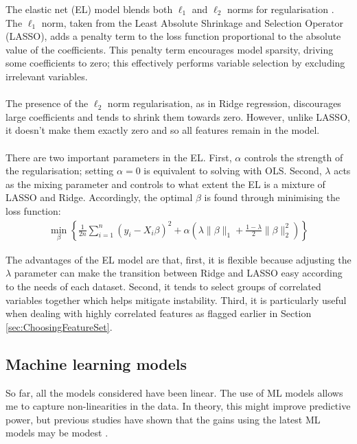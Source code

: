\documentclass[12pt,twoside]{report}
\begin{document}
The elastic net (EL) model blends both $\ell_1$ and $\ell_2$ norms for regularisation \cite{ZouHastie2005}. The $\ell_1$ norm, taken from the Least Absolute Shrinkage and Selection Operator (LASSO), adds a penalty term to the loss function proportional to the absolute value of the coefficients. This penalty term encourages model sparsity, driving some coefficients to zero; this effectively performs variable selection by excluding irrelevant variables. 
\\\\
The presence of the $\ell_2$ norm regularisation, as in Ridge regression, discourages large coefficients and tends to shrink them towards zero. However, unlike LASSO, it doesn't make them exactly zero and so all features remain in the model. 
\\\\
There are two important parameters in the EL. First, $\alpha$ controls the strength of the regularisation; setting $\alpha=0$ is equivalent to solving with OLS. Second, $\lambda$ acts as the mixing parameter and controls to what extent the EL is a mixture of LASSO and Ridge. Accordingly, the optimal $\beta$ is found through minimising the loss function:
\begin{align}
    \min_{\beta} \left\{ \frac{1}{2n} \sum_{i=1}^{n} \left( y_i - X_i\beta \right)^2 + \alpha \left( \lambda \|\beta\|_1 + \frac{1-\lambda}{2} \|\beta\|_2^2 \right) \right\}
\end{align}

The advantages of the EL model are that, first, it is flexible because adjusting the $\lambda$ parameter can make the transition between Ridge and LASSO easy according to the needs of each dataset. Second, it tends to select groups of correlated variables together which helps mitigate instability. Third, it is particularly useful when dealing with highly correlated features as flagged earlier in Section \ref{sec:ChoosingFeatureSet}. 

\subsection{Machine learning models}

So far, all the models considered have been linear. The use of ML models allows me to capture non-linearities in the data. In theory, this might improve predictive power, but previous studies have shown that the gains using the latest ML models may be modest \cite{nguyen2021, Nguyenetal2023}. 
\end{document}
